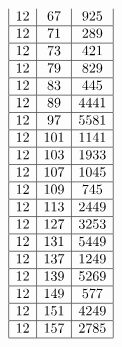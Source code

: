 \documentclass[a4paper, 10pt]{article}
\begin{document}
\begin{center}
\begin{minipage}[t]{.23\textwidth}
\begin{displaymath}
\begin{array}{|c|c|c|}
12 & 67 & 925 \\ \hline
12 & 71 & 289 \\ \hline
12 & 73 & 421 \\ \hline
12 & 79 & 829 \\ \hline
12 & 83 & 445 \\ \hline
12 & 89 & 4441 \\ \hline
12 & 97 & 5581 \\ \hline
12 & 101 & 1141 \\ \hline
12 & 103 & 1933 \\ \hline
12 & 107 & 1045 \\ \hline
12 & 109 & 745 \\ \hline
12 & 113 & 2449 \\ \hline
12 & 127 & 3253 \\ \hline
12 & 131 & 5449 \\ \hline
12 & 137 & 1249 \\ \hline
12 & 139 & 5269 \\ \hline
12 & 149 & 577 \\ \hline
12 & 151 & 4249 \\ \hline
12 & 157 & 2785 \\ \hline
\end{array}
\end{displaymath}
\end{minipage}
\end{center}
\end{document}
